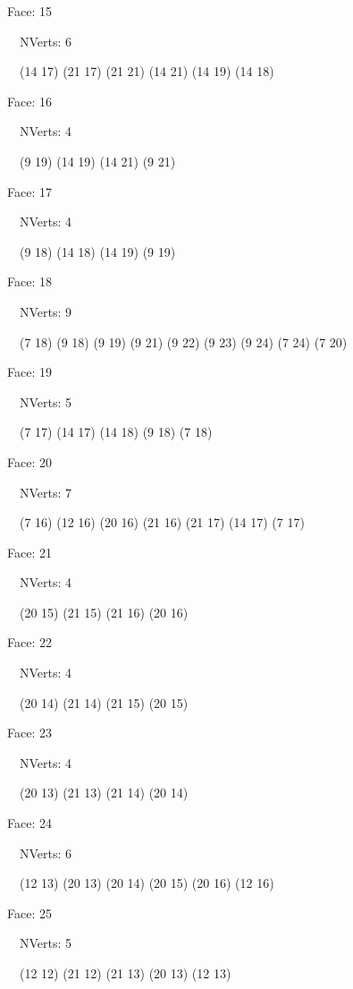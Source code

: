 \documentclass{article}
\begin{document}
{\footnotesize 

Face: 15

\   \    NVerts: 6

 \   \   (14 17) (21 17) (21 21) (14 21) (14 19) (14 18)}

{\footnotesize 

Face: 16

\   \    NVerts: 4

 \   \   (9 19) (14 19) (14 21) (9 21)}

{\footnotesize 

Face: 17

\   \    NVerts: 4

 \   \   (9 18) (14 18) (14 19) (9 19)}

{\footnotesize 

Face: 18

\   \    NVerts: 9

 \   \   (7 18) (9 18) (9 19) (9 21) (9 22) (9 23) (9 24) (7 24) (7 20)}

{\footnotesize 

Face: 19

\   \    NVerts: 5

 \   \   (7 17) (14 17) (14 18) (9 18) (7 18)}

{\footnotesize 

Face: 20

\   \    NVerts: 7

 \   \   (7 16) (12 16) (20 16) (21 16) (21 17) (14 17) (7 17)}

{\footnotesize 

Face: 21

\   \    NVerts: 4

 \   \   (20 15) (21 15) (21 16) (20 16)}

{\footnotesize 

Face: 22

\   \    NVerts: 4

 \   \   (20 14) (21 14) (21 15) (20 15)}

{\footnotesize 

Face: 23

\   \    NVerts: 4

 \   \   (20 13) (21 13) (21 14) (20 14)}

{\footnotesize 

Face: 24

\   \    NVerts: 6

 \   \   (12 13) (20 13) (20 14) (20 15) (20 16) (12 16)}

{\footnotesize 

Face: 25

\   \    NVerts: 5

 \   \   (12 12) (21 12) (21 13) (20 13) (12 13)}
\end{document}
